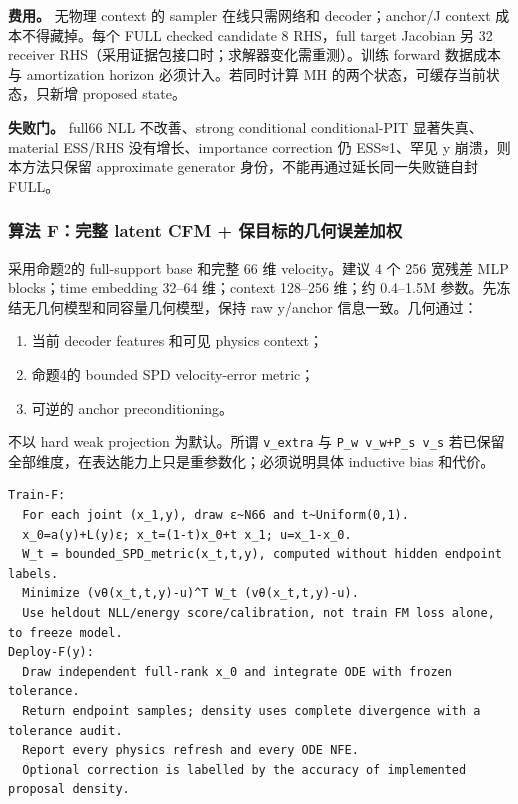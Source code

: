 \documentclass[
  11pt,
  a4paper,
]{article}
\providecommand{\tightlist}{%
  \setlength{\itemsep}{0pt}\setlength{\parskip}{0pt}}
\begin{document}
\textbf{费用。} 无物理 context 的 sampler 在线只需网络和
decoder；anchor/J context 成本不得藏掉。每个 FULL checked candidate 8
RHS，full target Jacobian 另 32 receiver
RHS（采用证据包接口时；求解器变化需重测）。训练 forward 数据成本与
amortization horizon 必须计入。若同时计算 MH
的两个状态，可缓存当前状态，只新增 proposed state。

\textbf{失败门。} full66 NLL 不改善、strong conditional conditional-PIT
显著失真、material ESS/RHS 没有增长、importance correction 仍
ESS≈1、罕见 y 崩溃，则本方法只保留 approximate generator
身份，不能再通过延长同一失败链自封 FULL。

\hypertarget{ux7b97ux6cd5-fux5b8cux6574-latent-cfm-ux4fddux76eeux6807ux7684ux51e0ux4f55ux8befux5deeux52a0ux6743}{%
\subsubsection{算法 F：完整 latent CFM +
保目标的几何误差加权}\label{ux7b97ux6cd5-fux5b8cux6574-latent-cfm-ux4fddux76eeux6807ux7684ux51e0ux4f55ux8befux5deeux52a0ux6743}}

采用命题2的 full-support base 和完整 66 维 velocity。建议 4 个 256
宽残差 MLP blocks；time embedding 32--64 维；context 128--256 维；约
0.4--1.5M 参数。先冻结无几何模型和同容量几何模型，保持 raw y/anchor
信息一致。几何通过：

\begin{enumerate}
\def\labelenumi{\arabic{enumi}.}
\tightlist
\item
  当前 decoder features 和可见 physics context；
\item
  命题4的 bounded SPD velocity-error metric；
\item
  可逆的 anchor preconditioning。
\end{enumerate}

不以 hard weak projection 为默认。所谓 \nolinkurl{v_extra} 与
\texttt{P\_\allowbreak{}w\ v\_\allowbreak{}w+P\_\allowbreak{}s\ v\_\allowbreak{}s}
若已保留全部维度，在表达能力上只是重参数化；必须说明具体 inductive bias
和代价。

\begin{verbatim}
Train-F:
  For each joint (x_1,y), draw ε~N66 and t~Uniform(0,1).
  x_0=a(y)+L(y)ε; x_t=(1-t)x_0+t x_1; u=x_1-x_0.
  W_t = bounded_SPD_metric(x_t,t,y), computed without hidden endpoint labels.
  Minimize (vθ(x_t,t,y)-u)^T W_t (vθ(x_t,t,y)-u).
  Use heldout NLL/energy score/calibration, not train FM loss alone, to freeze model.
Deploy-F(y):
  Draw independent full-rank x_0 and integrate ODE with frozen tolerance.
  Return endpoint samples; density uses complete divergence with a tolerance audit.
  Report every physics refresh and every ODE NFE.
  Optional correction is labelled by the accuracy of implemented proposal density.
\end{verbatim}
\end{document}

